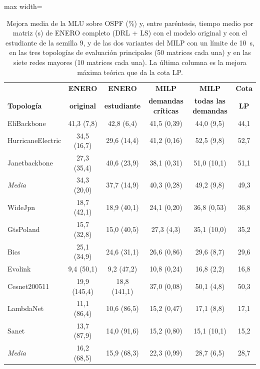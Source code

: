 \begin{table}[H]
	\centering
	\footnotesize
	\setlength{\tabcolsep}{4pt}
	\begin{adjustbox}{max width=\textwidth}
	\begin{tabular}{lccccc}
		\toprule
		& \textbf{ENERO} & \textbf{ENERO} & \textbf{MILP} & \textbf{MILP} & \textbf{Cota} \\
		\textbf{Topología} & \textbf{original} & \textbf{estudiante} & \textbf{demandas críticas} & \textbf{todas las demandas} & \textbf{LP} \\
		\midrule
		EliBackbone & 41,3 (7,8) & 42,8 (6,4) & 41,5 (0,39) & 44,0 (9,5) & 44,1 \\
		HurricaneElectric & 34,5 (16,7) & 29,6 (14,4) & 41,2 (0,16) & 52,5 (9,8) & 52,7 \\
		Janetbackbone & 27,3 (35,4) & 40,6 (23,9) & 38,1 (0,31) & 51,0 (10,1) & 51,1 \\
		\textit{Media} & 34,3 (20,0) & 37,7 (14,9) & 40,3 (0,28) & 49,2 (9,8) & 49,3 \\
		\midrule
		WideJpn & 18,7 (42,1) & 18,9 (40,1) & 24,1 (0,20) & 36,8 (0,53) & 36,8 \\
		GtsPoland & 15,7 (32,8) & 15,0 (40,5) & 27,3 (4,3) & 35,1 (10,0) & 35,2 \\
		Bics & 25,1 (34,9) & 24,6 (31,1) & 26,6 (0,86) & 29,6 (8,7) & 29,6 \\
		Evolink & 9,4 (50,1) & 9,2 (47,2) & 10,8 (0,24) & 16,8 (2,2) & 16,8 \\
		Cesnet200511 & 19,9 (145,4) & 18,8 (141,1) & 37,0 (0,08) & 50,1 (4,8) & 50,3 \\
		LambdaNet & 11,1 (86,4) & 10,6 (86,5) & 15,2 (0,47) & 17,1 (8,8) & 17,1 \\
		Sanet & 13,7 (87,9) & 14,0 (91,6) & 15,2 (0,80) & 15,1 (10,1) & 15,2 \\
		\textit{Media} & 16,2 (68,5) & 15,9 (68,3) & 22,3 (0,99) & 28,7 (6,5) & 28,7 \\
		\bottomrule
	\end{tabular}
	\end{adjustbox}
	\caption[Comparación de ENERO con la formulación exacta MILP]{Mejora media de la MLU sobre OSPF (\%) y, entre paréntesis, tiempo medio por matriz (s) de ENERO completo (DRL + LS) con el modelo original y con el estudiante de la semilla 9, y de las dos variantes del MILP con un límite de 10~s, en las tres topologías de evaluación principales (50 matrices cada una) y en las siete redes mayores (10 matrices cada una). La última columna es la mejora máxima teórica que da la cota LP.}
	\label{tab:res_milp}
\end{table}

